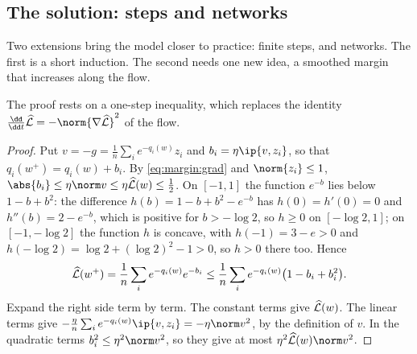 \begin{refsection}
\section{The solution: steps and networks}\label{sec:margin:steps}

Two extensions bring the model closer to practice: finite steps, and networks. The first is a short induction. The second needs one new idea, a smoothed margin that increases along the flow.


The proof rests on a one-step inequality, which replaces the identity $\frac{\dd}{\dd t}\Lhat=-\norm{\nabla\Lhat}^2$ of the flow.


\begin{proof}
Put $v=-g=\frac1n\sum_ie^{-q_i(w)}z_i$ and $b_i=\eta\ip{v,z_i}$, so that $q_i(w^+)=q_i(w)+b_i$. By \eqref{eq:margin:grad} and $\norm{z_i}\le1$, $\abs{b_i}\le\eta\norm v\le\eta\Lhat(w)\le\frac12$. On $[-1,1]$ the function $e^{-b}$ lies below $1-b+b^2$: the difference $h(b)=1-b+b^2-e^{-b}$ has $h(0)=h'(0)=0$ and $h''(b)=2-e^{-b}$, which is positive for $b>-\log2$, so $h\ge0$ on $[-\log2,1]$; on $[-1,-\log2]$ the function $h$ is concave, with $h(-1)=3-e>0$ and $h(-\log2)=\log2+(\log2)^2-1>0$, so $h>0$ there too. Hence
\[
  \widehat{\mathcal{L}}(w^+)=\frac1n\sum_ie^{-q_i(w)}e^{-b_i}\le\frac1n\sum_ie^{-q_i(w)}\bigl(1-b_i+b_i^2\bigr).
\]
Expand the right side term by term. The constant terms give $\widehat{\mathcal{L}}(w)$. The linear terms give $-\frac\eta n\sum_ie^{-q_i(w)}\ip{v,z_i}=-\eta\norm v^2$, by the definition of $v$. In the quadratic terms $b_i^2\le\eta^2\norm v^2$, so they give at most $\eta^2\Lhat(w)\norm v^2$.
\end{proof}


\end{refsection}
